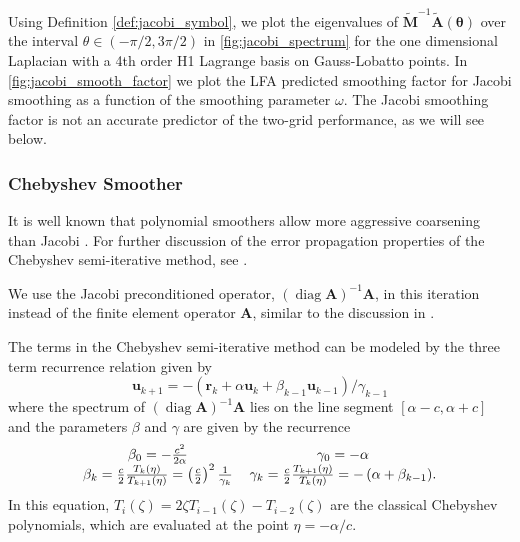 \documentclass[review]{siamart190516}
\DeclareMathOperator{\diag}{diag}
\begin{document}
Using Definition \ref{def:jacobi_symbol}, we plot the eigenvalues of $\tilde{\mathbf{M}}^{-1} \tilde{\mathbf{A}} \left( \boldsymbol{\theta} \right)$ over the interval $\theta \in \left( - \pi / 2, 3 \pi / 2 \right)$ in \cref{fig:jacobi_spectrum} for the one dimensional Laplacian with a 4th order H1 Lagrange basis on Gauss-Lobatto points.
In \cref{fig:jacobi_smooth_factor} we plot the LFA predicted smoothing factor for Jacobi smoothing as a function of the smoothing parameter $\omega$.
The Jacobi smoothing factor is not an accurate predictor of the two-grid performance, as we will see below.

\subsubsection{Chebyshev Smoother}\label{sec:chebyshev}

It is well known that polynomial smoothers allow more aggressive coarsening than Jacobi \cite{brannick2015polynomial}.
For further discussion of the error propagation properties of the Chebyshev semi-iterative method, see \cite{gutknecht2002revisited}.

We use the Jacobi preconditioned operator, $\left( \diag {\mathbf{A}} \right)^{-1} {\mathbf{A}}$, in this iteration instead of the finite element operator ${\mathbf{A}}$, similar to the discussion in \cite{adams2003parallel}.

The terms in the Chebyshev semi-iterative method can be modeled by the three term recurrence relation given by
\begin{equation}
\mathbf{u}_{k + 1} = - \left( \mathbf{r}_k + \alpha \mathbf{u}_k + \beta_{k - 1} \mathbf{u}_{k - 1} \right) / \gamma_{k - 1}
\label{eq:chebyshev_recursive}
\end{equation}
where the spectrum of $\left( \diag {\mathbf{A}} \right)^{-1} {\mathbf{A}}$ lies on the line segment $\left[ \alpha - c, \alpha + c \right]$ and the parameters $\beta$ and $\gamma$ are given by the recurrence
\begin{equation}
\begin{tabular}{c c}
$\beta_0 = - \frac{c^2}{2 \alpha}$ & $\gamma_0 = - \alpha$\\
$\beta_k = \frac{c}{2} \frac{T_k \left( \eta \right)}{T_{k + 1} \left( \eta \right)} = \left( \frac{c}{2} \right)^2 \frac{1}{\gamma_k}$ & $\gamma_k = \frac{c}{2} \frac{T_{k + 1} \left( \eta \right)}{T_k \left( \eta \right)} = - \left( \alpha + \beta_{k - 1} \right)$.
\end{tabular}
\end{equation}
In this equation, $T_i \left( \zeta \right) = 2 \zeta T_{i - 1} \left( \zeta \right) - T_{i - 2} \left( \zeta \right)$ are the classical Chebyshev polynomials, which are evaluated at the point $\eta = - \alpha / c$.
\end{document}
